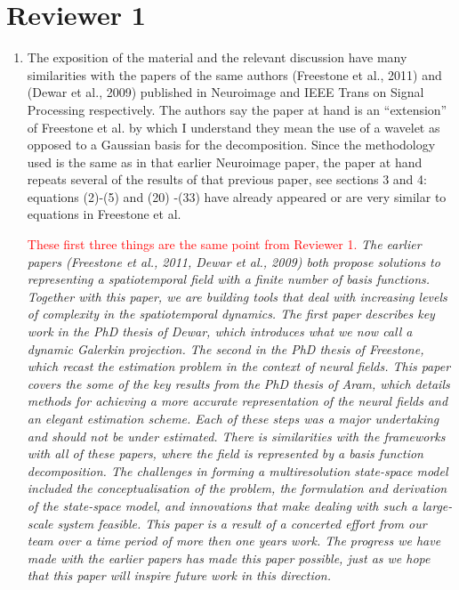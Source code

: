 \documentclass{article}
\newcommand{\dean}[1]{\textcolor{red}{#1}}
\begin{document}
    \section{Reviewer 1}
    


    \begin{enumerate}
        \item The exposition of the material and the relevant discussion have many similarities with the papers of the same authors (Freestone et al., 2011) and (Dewar et al., 2009) published in Neuroimage and IEEE Trans on Signal Processing  respectively. The authors say the paper at hand is an ``extension'' of Freestone et al. by which I understand they mean the use of a wavelet as opposed to a Gaussian basis for the decomposition. Since the methodology used is the same as in that earlier Neuroimage paper, the paper at hand repeats several of  the results of that previous paper, see sections 3 and 4: equations (2)-(5) and (20) -(33) have already appeared or are very similar to equations in Freestone et al.   
								 
\dean{These first three things are the same point from Reviewer 1.}
	\emph{The earlier papers (Freestone et al., 2011, Dewar et al., 2009) both propose solutions to representing a spatiotemporal field with a finite number of basis functions. Together with this paper, we are building tools that deal with increasing levels of complexity in the spatiotemporal dynamics. The first paper describes key work in the PhD thesis of Dewar, which introduces what we now call a dynamic Galerkin projection. The second in the PhD thesis of Freestone, which recast the estimation problem in the context of neural fields. This paper covers the some of the key results from the PhD thesis of Aram, which details methods for achieving a more accurate representation of the neural fields and an elegant estimation scheme. Each of these steps was a major undertaking and should not be under estimated. There is similarities with the frameworks with all of these papers, where the field is represented by a basis function decomposition. The challenges in forming a multiresolution state-space model included the conceptualisation of the problem, the formulation and derivation of the state-space model, and innovations that make dealing with such a large-scale system feasible. This paper is a result of a concerted effort from our team over a time period of more then one years work. The progress we have made with the earlier papers has made this paper possible, just as we hope that this paper will inspire future work in this direction.}
	        

\end{enumerate}
\end{document}
